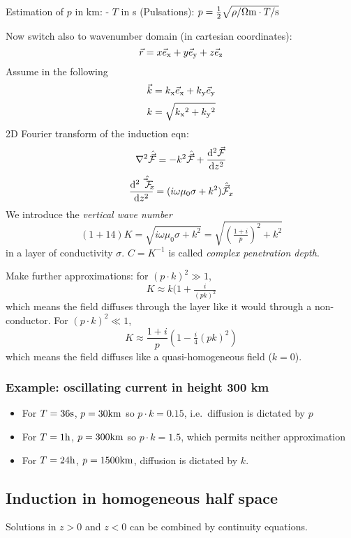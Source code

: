 Estimation of \(p\) in km: - \(T\) in s (Pulsations):
\(p = \tfrac12\sqrt{\rho/\mathrm{\Omega m} \cdot T/\mathrm{s}}\)

Now switch also to wavenumber domain (in cartesian coordinates): \[
  \vec{r} = x \vec{e}\text{$_{\mathrm{x}}$} + y\vec{e}\text{$_{\mathrm{y}}$} + z\vec{e}\text{$_{\mathrm{z}}$}
\] Assume in the following \[
  \vec{k} = k\text{$_{\mathrm{x}}$}\vec{e}\text{$_{\mathrm{x}}$} + k\text{$_{\mathrm{y}}$}\vec{e}\text{$_{\mathrm{y}}$}
\] \[
  k = \sqrt{k\text{$_{\mathrm{x}}$}^2 + k\text{$_{\mathrm{y}}$}^2}
\] 2D Fourier transform of the induction eqn: \setcounter{equation}{13}\[
  \nabla^2\hat{\vec{\mathcal{F}}} = -k^2 \hat{\vec{\mathcal{F}}} + \frac{\mathrm{d}^2\vec{\mathcal{F}}}{\mathrm{d} z^2}
\] \[
  \frac{\mathrm{d}^2\hat{\vec{\mathcal{F}}_x}}{\mathrm{d} z^2} = (i\omega\mu_0\sigma + k^2)\hat{\vec{\mathcal{F}}}_x
\] We introduce the \emph{vertical wave number} \[(1+14)
  K = \sqrt{i\omega\mu_0\sigma + k^2} = \sqrt{(\tfrac{1+i}{p})^2 + k^2}
\] in a layer of conductivity \(\sigma\). \(C = K^{-1}\) is called
\emph{complex penetration depth}.

Make further approximations: for \((p\cdot k)^2 \gg 1\), \[
  K \approx k(1+\tfrac{i}{(pk)^2}
\] which means the field diffuses through the layer like it would
through a non-conductor. For \((p\cdot k)^2 \ll 1\), \[
  K \approx \frac{1+i}{p}(1 - \tfrac{i}4(pk)^2)
\] which means the field diffuses like a quasi-homogeneous field
(\(k=0\)).

\subsubsection{Example: oscillating current in height 300
km}\label{example-oscillating-current-in-height-300-km}

\begin{itemize}
\tightlist
\item
  For \(T = 36\mathrm{s}\), \(p = 30\mathrm{km}\) so \(p\cdot k = 0.15\),
  i.e.~diffusion is dictated by \(p\)
\item
  For \(T = 1\mathrm{h}\), \(p = 300\mathrm{km}\) so \(p\cdot k = 1.5\),
  which permits neither approximation
\item
  For \(T = 24\mathrm{h}\), \(p = 1500\mathrm{km}\), diffusion is dictated
  by \(k\).
\end{itemize}

\subsection{Induction in homogeneous half
space}\label{induction-in-homogeneous-half-space}

Solutions in \(z>0\) and \(z<0\) can be combined by continuity
equations.


